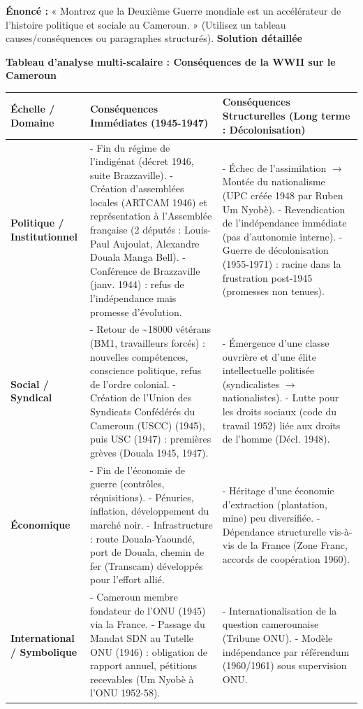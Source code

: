 \documentclass[11pt]{article}
\newcommand{\cle}[1]{{\popxbold\color{popdark}#1}}
\begin{document}
\begin{exoresolu}
\textbf{Énoncé :} « Montrez que la Deuxième Guerre mondiale est un accélérateur de l'histoire politique et sociale au Cameroun. » (Utilisez un tableau causes/conséquences ou paragraphes structurés).
\tcblower
\textbf{Solution détaillée}

\textbf{Tableau d'analyse multi-scalaire : Conséquences de la WWII sur le Cameroun}

\begin{center}
\begin{tabularx}{\linewidth}{|>{\bfseries}X|X|X|}\hline
\rowcolor{popblueL}
\textbf{Échelle / Domaine} & \textbf{Conséquences Immédiates (1945-1947)} & \textbf{Conséquences Structurelles (Long terme : Décolonisation)} \\ \hline
\textbf{Politique / Institutionnel} & 
- Fin du régime de l'indigénat (décret 1946, suite Brazzaville).
- Création d'assemblées locales (ARTCAM 1946) et représentation à l'Assemblée française (2 députés : Louis-Paul Aujoulat, Alexandre Douala Manga Bell).
- Conférence de Brazzaville (janv. 1944) : refus de l'indépendance mais promesse d'évolution. & 
- Échec de l'assimilation $\rightarrow$ Montée du nationalisme (\cle{UPC} créée 1948 par Ruben Um Nyobè).
- Revendication de l'indépendance immédiate (pas d'autonomie interne).
- Guerre de décolonisation (1955-1971) : racine dans la frustration post-1945 (promesses non tenues). \\ \hline
\textbf{Social / Syndical} & 
- Retour de \num{~18000} vétérans (BM1, travailleurs forcés) : nouvelles compétences, conscience politique, refus de l'ordre colonial.
- Création de l'\cle{Union des Syndicats Confédérés du Cameroun (USCC)} (1945), puis \cle{USC} (1947) : premières grèves (Douala 1945, 1947). & 
- Émergence d'une \cle{classe ouvrière} et d'une \cle{élite intellectuelle} politisée (syndicalistes $\rightarrow$ nationalistes).
- Lutte pour les droits sociaux (code du travail 1952) liée aux droits de l'homme (Décl. 1948). \\ \hline
\textbf{Économique} & 
- Fin de l'économie de guerre (contrôles, réquisitions).
- Pénuries, inflation, développement du marché noir.
- Infrastructure : route Douala-Yaoundé, port de Douala, chemin de fer (Transcam) développés pour l'effort allié. & 
- Héritage d'une économie d'extraction (plantation, mine) peu diversifiée.
- Dépendance structurelle vis-à-vis de la France (Zone Franc, accords de coopération 1960). \\ \hline
\textbf{International / Symbolique} & 
- Cameroun membre fondateur de l'\cle{ONU} (1945) via la France.
- Passage du \cle{Mandat SDN} au \cle{Tutelle ONU} (1946) : obligation de rapport annuel, pétitions recevables (Um Nyobè à l'ONU 1952-58). & 
- Internationalisation de la question camerounaise (Tribune ONU).
- Modèle \cle{indépendance par référendum} (1960/1961) sous supervision ONU. \\ \hline
\end{tabularx}
\end{center}


\end{exoresolu}
\end{document}

